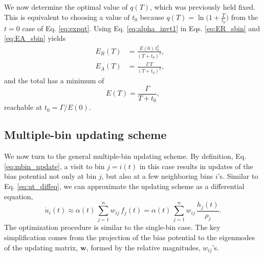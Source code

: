 \documentclass[reprint, superscriptaddress, floatfix]{revtex4-1}
\newcommand{\Err}{E}
\begin{document}
We now determine the optimal value of $q(T)$,
which was previously held fixed.
%
This is equivalent to choosing a value of $t_0$
because $q(T) = \ln\bigl(1 + \frac{T}{t_0}\bigr)$
from the $t = 0$ case of Eq. \eqref{eq:expqt}.
%
Using Eq. \eqref{eq:alpha_invt1} in
Eqs. \eqref{eq:ER_sbin} and \eqref{eq:EA_sbin}
yields
\begin{align}
  \Err_R(T)
  &= \frac{ \Err(0) \, t_0^2 } { (T + t_0)^2 }
  ,
  &
  \\
  \Err_A(T)
  &= \frac{ \Gamma \, T } { (T + t_0)^2 }
  ,
\end{align}
%
and the total has a minimum of
\begin{equation}
  \Err(T)
  =
  \frac{ \Gamma } { T + t_0 }
  ,
  \label{eq:Emin_sbin}
\end{equation}
%
reachable at $t_0 = \Gamma /\Err(0)$.
%
%



\subsection{\label{sec:multiple-bin}
Multiple-bin updating scheme}



We now turn to the general multiple-bin updating scheme.
%
By definition, Eq. \eqref{eq:mbin_update},
a visit to bin $j = i(t)$ in this case results in updates of the bias potential
not only at bin $j$, but also at a few neighboring bins $i$'s.
%
Similar to Eq. \eqref{eq:ut_diffeq},
we can approximate the updating scheme
as a differential equation,
%
\begin{equation}
  \dot u_i(t)
  \approx
  \alpha(t) \,
  \sum_{j=1}^n w_{ij} \, f_j(t)
  =
  \alpha(t) \,
  \sum_{j=1}^n w_{ij} \, \frac{ h_j(t) } { \rho_j }
  .
  \label{eq:ut_diffeq_mbin}
\end{equation}
%
The optimization procedure is similar to
the single-bin case.
%
The key simplification comes from the
projection of the bias potential to the eigenmodes
of the updating matrix, $\mathbf w$,
formed by the relative magnitudes, $w_{ij}$'s.
\end{document}
